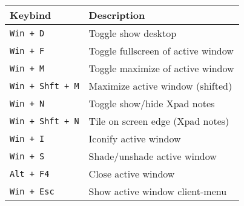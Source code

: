 \documentclass[letterpaper,12pt]{article}
\begin{document}
\begin{table}[H]
  \begin{tabular}{|C{5cm}|L{10cm}|}
    \hline
    \textbf{Keybind} & \textbf{Description} \\
    \hline
    {\tt Win + D} & Toggle show desktop \\
    {\tt Win + F} & Toggle fullscreen of active window \\
    {\tt Win + M} & Toggle maximize of active window \\
    {\tt Win + Shft + M} & Maximize active window (shifted) \\
    {\tt Win + N} & Toggle show/hide Xpad notes \\
    {\tt Win + Shft + N} & Tile on screen edge (Xpad notes) \\
    {\tt Win + I} & Iconify active window \\
    {\tt Win + S} & Shade/unshade active window \\
    {\tt Alt + F4} & Close active window \\
    {\tt Win + Esc} & Show active window client-menu \\
    \hline
  \end{tabular}
\end{table}


\end{document}
